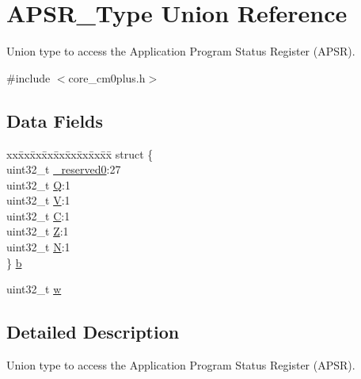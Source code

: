\hypertarget{union_a_p_s_r___type}{}\section{A\+P\+S\+R\+\_\+\+Type Union Reference}
\label{union_a_p_s_r___type}


Union type to access the Application Program Status Register (A\+P\+SR).  




{\ttfamily \#include $<$core\+\_\+cm0plus.\+h$>$}

\subsection*{Data Fields}
\begin{DoxyCompactItemize}
\item 
\begin{tabbing}
xx\=xx\=xx\=xx\=xx\=xx\=xx\=xx\=xx\=\kill
struct \{\\
\>uint32\_t \mbox{\hyperlink{union_a_p_s_r___type_ac8a6a13838a897c8d0b8bc991bbaf7c1}{\_reserved0}}:27\\
\>uint32\_t \mbox{\hyperlink{union_a_p_s_r___type_a65f27ddc4f7e09c14ce7c5211b2e000a}{Q}}:1\\
\>uint32\_t \mbox{\hyperlink{union_a_p_s_r___type_acd4a2b64faee91e4a9eef300667fa222}{V}}:1\\
\>uint32\_t \mbox{\hyperlink{union_a_p_s_r___type_a7a1caf92f32fe9ebd8d1fe89b06c7776}{C}}:1\\
\>uint32\_t \mbox{\hyperlink{union_a_p_s_r___type_a5ae954cbd9986cd64625d7fa00943c8e}{Z}}:1\\
\>uint32\_t \mbox{\hyperlink{union_a_p_s_r___type_abae0610bc2a97bbf7f689e953e0b451f}{N}}:1\\
\} \mbox{\hyperlink{union_a_p_s_r___type_a48da8f4b5d38514ede88613258c74520}{b}}\\

\end{tabbing}\item 
uint32\+\_\+t \mbox{\hyperlink{union_a_p_s_r___type_ad0fb62e7a08e70fc5e0a76b67809f84b}{w}}
\end{DoxyCompactItemize}


\subsection{Detailed Description}
Union type to access the Application Program Status Register (A\+P\+SR). 

